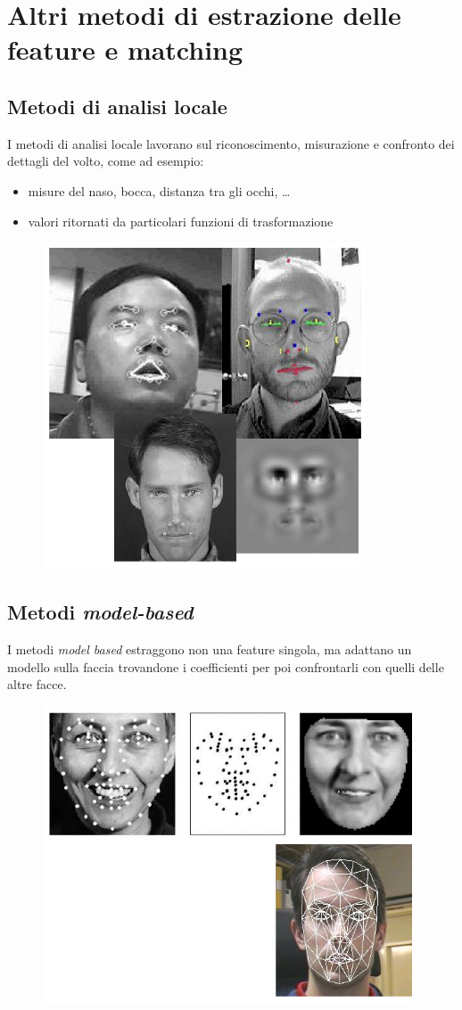 \documentclass{report}
\begin{document}
\newpage
\section{Altri metodi di estrazione delle feature e matching}

\subsection{Metodi di analisi locale}
I metodi di analisi locale lavorano sul riconoscimento, misurazione e 
confronto dei dettagli del volto, come ad esempio:
\begin{itemize}
    \item misure del naso, bocca, distanza tra gli occhi, \dots
    \item valori ritornati da particolari funzioni di trasformazione
\end{itemize}

\begin{figure}[ht]
    \centering
    \includegraphics[width=0.4\linewidth]{images/analisi-locale.png}
\end{figure}

\subsection{Metodi \textit{model-based}}
I metodi \textit{model based} estraggono non una feature singola, ma 
adattano un modello sulla faccia trovandone i coefficienti per 
poi confrontarli con quelli delle altre facce.

\begin{figure}[ht]
    \centering
    \includegraphics[width=0.5\linewidth]{images/model-based.png}
\end{figure}
\end{document}
